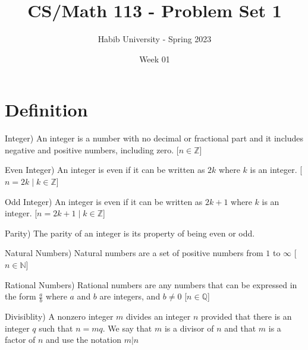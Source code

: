 \documentclass[addpoints]{exam}
\title{CS/Math 113 - Problem Set 1}
\author{Habib University - Spring 2023}
\date{Week 01}
\newenvironment{definition}[2][Definition]{\begin{trivlist}
    \item[\hskip \labelsep {\bfseries #1}\hskip \labelsep {\bfseries #2.}]}{\end{trivlist}}
\begin{document}
\maketitle

\section{Definition}
\begin{definition}{1}(Integer)
    An integer is a number with no decimal or fractional part and it includes negative and positive numbers, including zero. [$ n \in \mathbb{Z} $]
\end{definition}

\begin{definition}{2}(Even Integer)
    An integer is even if it can be written as $2k$ where $k$ is an integer. [$ n = 2k \; | \;  k \in \mathbb{Z} $]
\end{definition}

\begin{definition}{3}(Odd Integer)
    An integer is even if it can be written as $2k+1$ where $k$ is an integer. [$ n = 2k+1 \; | \; k \in \mathbb{Z} $]
\end{definition}

\begin{definition}{4}(Parity)
    The parity of an integer is its property of being even or odd. 
\end{definition}

\begin{definition}{5}(Natural Numbers)
    Natural numbers are a set of positive numbers from $1$ to $\infty$ [$ n \in \mathbb{N} $]
\end{definition}

\begin{definition}{6}(Rational Numbers)
    Rational numbers are any numbers that can be expressed in the form $\frac{a}{b}$ where $a$ and $b$ are integers, and $b \neq  0$ [$ n \in \mathbb{Q} $]
\end{definition}

\begin{definition}{7}(Divisiblity)
    A nonzero integer $m$ divides an integer $n$ provided that there is an integer $q$ such that $n=mq$. We say that $m$ is a divisor of $n$
    and that $m$ is a factor of $n$ and use the notation $ m | n$
\end{definition}
\end{document}
